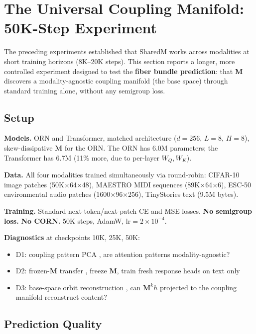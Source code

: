 \documentclass[11pt, a4paper]{article}
\newcommand{\M}{\mathbf{M}}
\theoremstyle{plain}
\theoremstyle{remark}
\begin{document}
\section{The Universal Coupling Manifold: 50K-Step Experiment}
\label{sec:universal-manifold}

The preceding experiments established that SharedM works across modalities at short training horizons (8K--20K steps).
This section reports a longer, more controlled experiment designed to test the \textbf{fiber bundle prediction}: that $\M$ discovers a modality-agnostic coupling manifold (the base space) through standard training alone, without any semigroup loss.

\subsection{Setup}

\textbf{Models.} ORN and Transformer, matched architecture ($d{=}256$, $L{=}8$, $H{=}8$), skew-dissipative $\M$ for the ORN.
The ORN has 6.0M parameters; the Transformer has 6.7M (11\% more, due to per-layer $W_Q, W_K$).

\textbf{Data.} All four modalities trained simultaneously via round-robin: CIFAR-10 image patches (50K$\times$64$\times$48), MAESTRO MIDI sequences (89K$\times$64$\times$6), ESC-50 environmental audio patches (1600$\times$96$\times$256), TinyStories text (9.5M bytes).

\textbf{Training.} Standard next-token/next-patch CE and MSE losses. \textbf{No semigroup loss.} \textbf{No CORN.} 50K steps, AdamW, $\text{lr} = 2 \times 10^{-4}$.

\textbf{Diagnostics} at checkpoints 10K, 25K, 50K:
\begin{itemize}[nosep]
    \item D1: coupling pattern PCA ,  are attention patterns modality-agnostic?
    \item D2: frozen-$\M$ transfer ,  freeze $\M$, train fresh response heads on text only
    \item D3: base-space orbit reconstruction ,  can $\M^k h$ projected to the coupling manifold reconstruct content?
\end{itemize}

\subsection{Prediction Quality}
\end{document}
